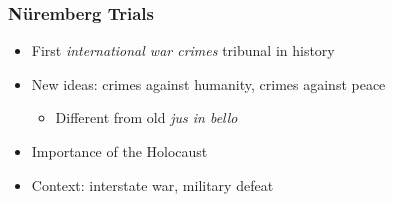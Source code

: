 \documentclass[aspectratio=43]{beamer}
\begin{document}
\begin{frame}
\frametitle{Nüremberg Trials}
\centering

\begin{itemize}
  \item First \textit{international war crimes} tribunal in history
  \item<2-> New ideas: crimes against humanity, crimes against peace
  \begin{itemize}
    \item Different from old \textit{jus in bello}
  \end{itemize}
  \item<3-> Importance of the Holocaust
  \item<4-> Context: interstate war, military defeat
\end{itemize}

\end{frame}
\end{document}
